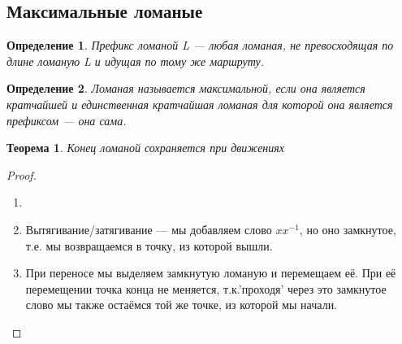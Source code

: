 \documentclass[12pt,a4paper, flushleft]{article}
\newtheorem{Def}{Определение}[section]
\newtheorem{Th}{Теорема}[section]
\begin{document}
\subsection{Максимальные ломаные}

\begin{Def}
	Префикс ломаной L --- любая ломаная, не превосходящая по длине ломаную L и идущая по тому же маршруту. 
\end{Def}

\begin{Def}
	Ломаная называется максимальной, если она является кратчайшей и единственная кратчайшая ломаная для которой она является префиксом --- она сама.
\end{Def}

\begin{Th}
	Конец ломаной сохраняется при движениях
\end{Th}
\begin{proof}
	\begin{enumerate}
		\item []
		\item Вытягивание/затягивание --- мы добавляем слово $xx^{-1}$, но оно замкнутое, т.е. мы возвращаемся в точку, из которой вышли.
		\item При переносе мы выделяем замкнутую ломаную и перемещаем её. При её перемещении  точка конца не меняется, т.к.'проходя' через это замкнутое слово мы также остаёмся той же точке, из которой мы начали.
	\end{enumerate}
\end{proof}
\end{document}
